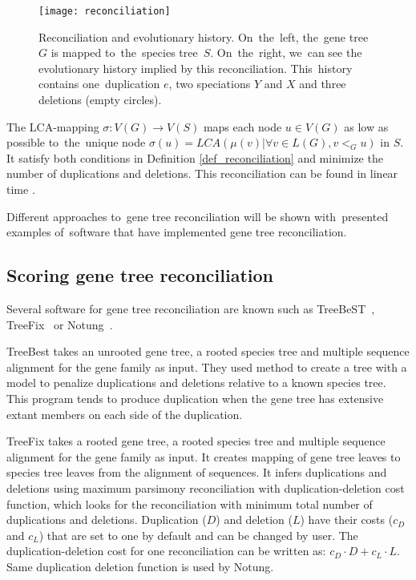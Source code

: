 \begin{figure}[h]
	\centering
	\label{reconciliation}
  	\texttt{[image: reconciliation]}
  	\caption{Reconciliation and evolutionary history. On~the~left, the~gene tree~$G$ is mapped to~the~species tree~$S$. On~the~right, we~can see the evolutionary history implied by this reconciliation. This~history contains one~duplication $e$, two speciations $Y$ and $X$ and three deletions (empty circles).}
\end{figure}

The LCA-mapping $\sigma: V(G) \rightarrow V(S)$ maps each node $u \in V(G)$ as low as possible to~the~unique node $\sigma(u) = LCA(\mu(v) | \forall v \in L(G), v<_Gu)$ in $S$. It satisfy both conditions in Definition \ref{def_reconciliation} and minimize the number of duplications and deletions. This reconciliation can be found in linear time \cite{hasic}.

Different approaches to~gene tree reconciliation will be shown with~presented examples of~software that have implemented gene tree reconciliation. 


\subsection{Scoring gene tree reconciliation}
Several software for gene tree reconciliation are known such as TreeBeST~\cite{treebest}, TreeFix~\cite{treefix} or Notung~\cite{notung}. 

TreeBest takes an unrooted gene tree, a rooted species tree and multiple sequence alignment for the gene family as input. They used method to create a tree with a model to penalize duplications and deletions relative to a known species tree. This program tends to produce duplication when the gene tree has extensive extant members on each side of the duplication.

TreeFix takes a rooted gene tree, a rooted species tree and multiple sequence alignment for the gene family as input. It creates mapping of gene tree leaves to species tree leaves from the alignment of sequences. It infers duplications and deletions using maximum parsimony reconciliation with duplication-deletion cost function, which looks for the reconciliation with minimum total number of duplications and deletions. Duplication ($D$) and deletion ($L$) have their costs ($c_D$ and $c_L$) that are set to one by default and can be changed by user. The duplication-deletion cost for one reconciliation can be written as: $c_D \cdot D+c_L \cdot L$. Same duplication deletion function is used by Notung.

